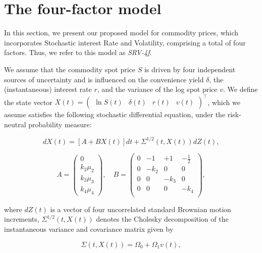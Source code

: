 \documentclass{article}
\begin{document}
\section{The four-factor model} \label{sec_model}


In this section, we present our proposed model for commodity prices, which incorporates Stochastic interest Rate and Volatility, comprising a total of four factors. Thus, we refer to this model as \textit{SRV-4f}.

We assume that the commodity spot price \(S\) is driven by four independent sources of uncertainty and is influenced on the convenience yield \(\delta\), the (instantaneous) interest rate \(r\), and the variance of the log spot price \(v\). We define the state vector \({X}(t) = \begin{pmatrix} \ln S(t) & \delta(t) & r(t) & v(t) \end{pmatrix}^\top\), which we assume satisfies the following stochastic differential equation, under the risk-neutral probability measure:



\begin{equation} \label{eq_statevar}
    d {X}(t) = [A + B {X}(t)] dt + {\Sigma}^{1/2}(t,X(t)) d {Z}(t), 
\end{equation}

\begin{equation*}
    {A} =
\begin{pmatrix}
    0 \\
    k_2 \mu_2 \\
    k_3 \mu_3 \\
    k_4 \mu_4
\end{pmatrix}, \quad 
{B} = 
\begin{pmatrix}
    0 & -1 & +1 & -\frac{1}{2}\\
    0 & -k_2 & 0 & 0 \\
    0 & 0 & -k_3 & 0 \\
    0 & 0 & 0 & -k_4 \\
\end{pmatrix},
\end{equation*}

\noindent where $dZ(t)$ is a vector of four uncorrelated standard Brownian motion increments, $\Sigma^{1/2}(t,X(t))$ denotes the Cholesky decomposition of the instantaneous variance and covariance matrix given by

\begin{equation} \label{eq_diffusion}
    {\Sigma}(t,X(t)) = {\Omega}_0 +  {\Omega}_1 v(t),
\end{equation}
\end{document}
